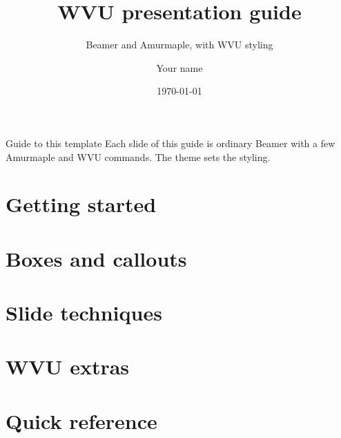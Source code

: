 \documentclass[aspectratio=169,10pt]{beamer}
\title[WVU guide]{WVU presentation guide}
\subtitle{Beamer and Amurmaple, with WVU styling}
\author[Your name]{Your name}
\institute[WVU]{West Virginia University}
\date{\today}
\begin{document}
\maketitle

\begin{frame}{Guide to this template}
  \tableofcontents[hideallsubsections,sections={1-4}]
  \vfill
  \small Each slide of this guide is ordinary Beamer with a few Amurmaple and
  WVU commands. The theme sets the styling.
\end{frame}

\section[Start]{Getting started}


\section[Boxes]{Boxes and callouts}


\section[Slides]{Slide techniques}


\section[Extras]{WVU extras}





\appendix
\section[Reference]{Quick reference}

\end{document}
